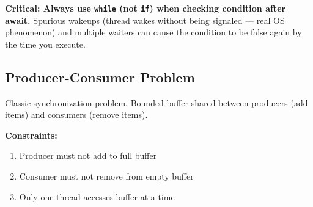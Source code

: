 \documentclass[11pt]{article}
\providecommand{\tightlist}{\setlength{\itemsep}{1pt}\setlength{\parskip}{0pt}}
\begin{document}
\textbf{Critical: Always use \texttt{while} (not \texttt{if}) when checking condition after await.} Spurious wakeups (thread wakes without being signaled --- real OS phenomenon) and multiple waiters can cause the condition to be false again by the time you execute.

\subsection{Producer-Consumer Problem}\label{producer-consumer-problem}

Classic synchronization problem. Bounded buffer shared between producers (add items) and consumers (remove items).

\textbf{Constraints:}

\begin{enumerate}
\def\labelenumi{\arabic{enumi}.}
\tightlist
\item
  Producer must not add to full buffer
\item
  Consumer must not remove from empty buffer
\item
  Only one thread accesses buffer at a time
\end{enumerate}

\end{document}
